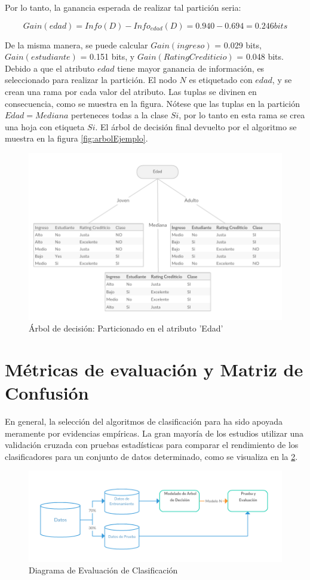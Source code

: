 Por lo tanto, la ganancia esperada de realizar tal partición seria:

\[
Gain(edad)=Info(D)-Info_{edad}(D)=0.940-0.694=0.246bits
\]

De la misma manera, se puede calcular $Gain(ingreso)$ = 0.029 bits,
$Gain(estudiante)$ = 0.151 bits, y $Gain(RatingCrediticio)$ = 0.048
bits. Debido a que el atributo $edad$ tiene mayor ganancia de información,
es seleccionado para realizar la partición. El nodo $N$ es etiquetado
con $edad$, y se crean una rama por cada valor del atributo. Las
tuplas se divinen en consecuencia, como se muestra en la figura. Nótese
que las tuplas en la partición $Edad=Mediana$ perteneces todas a
la clase $Si$, por lo tanto en esta rama se crea una hoja con etiqueta
$Si$. El árbol de decisión final devuelto por el algoritmo se muestra
en la figura \ref{fig:arbolEjemplo}.

\begin{figure}[!htbp]
\centering{}\includegraphics[width=0.7\linewidth]{capitulo-3/graphics/dtree_parti}
\caption[Árbol de decisión]{Árbol de decisión: Particionado en el atributo 'Edad'}
\label{fig:arbolPartEdad} 
\end{figure}


\section{Métricas de evaluación y Matriz de Confusión}

En general, la selección del algoritmos de clasificación para 
ha sido apoyada meramente por evidencias empíricas. La gran mayoría
de los estudios utilizar una validación cruzada con pruebas estadísticas
para comparar el rendimiento de los clasificadores para un conjunto
de datos determinado, como se visualiza en la \ref{fig:evaluacion}.

\begin{figure}[!htbp]
\centering{}\includegraphics[width=0.7\linewidth]{capitulo-3/graphics/training-test}
\caption[Diagrama de Evaluación de Clasificación]{Diagrama de Evaluación de Clasificación}
\label{fig:evaluacion} 
\end{figure}

